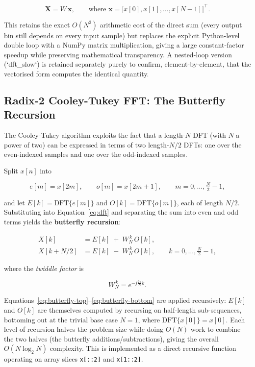 \documentclass[11pt]{article}
\begin{document}
\begin{equation}
\mathbf{X} = W\,\mathbf{x},
\qquad \text{where } \mathbf{x} = \big[x[0], x[1], \dots, x[N-1]\big]^{\!\top}.
\label{eq:dft-matrix-form}
\end{equation}

This retains the exact $O(N^2)$ arithmetic cost of the direct sum (every
output bin still depends on every input sample) but replaces the explicit
Python-level double loop with a NumPy matrix multiplication, giving a large
constant-factor speedup while preserving mathematical transparency. A
nested-loop version (`dft\_slow`) is retained separately purely to confirm,
element-by-element, that the vectorised form computes the identical
quantity.

\subsection{Radix-2 Cooley-Tukey FFT: The Butterfly Recursion}

The Cooley-Tukey algorithm exploits the fact that a length-$N$ DFT (with $N$
a power of two) can be expressed in terms of two length-$N/2$ DFTs: one over
the even-indexed samples and one over the odd-indexed samples.

Split $x[n]$ into

\begin{equation}
e[m] = x[2m], \qquad o[m] = x[2m+1], \qquad m = 0, \dots, \tfrac{N}{2}-1,
\end{equation}

and let $E[k] = \text{DFT}\{e[m]\}$ and $O[k] = \text{DFT}\{o[m]\}$, each of
length $N/2$. Substituting into Equation~\ref{eq:dft} and separating the sum
into even and odd terms yields the \textbf{butterfly recursion}:

\begin{align}
X[k]           &= E[k] \; + \; W_N^{\,k}\, O[k], \label{eq:butterfly-top}\\
X[k + N/2]     &= E[k] \; - \; W_N^{\,k}\, O[k], \qquad k = 0, \dots, \tfrac{N}{2}-1, \label{eq:butterfly-bottom}
\end{align}

where the \emph{twiddle factor} is

\begin{equation}
W_N^{\,k} = e^{-j \frac{2\pi}{N} k}.
\label{eq:twiddle-scalar}
\end{equation}

Equations~\ref{eq:butterfly-top}--\ref{eq:butterfly-bottom} are applied
recursively: $E[k]$ and $O[k]$ are themselves computed by recursing on
half-length sub-sequences, bottoming out at the trivial base case $N=1$,
where $\text{DFT}\{x[0]\} = x[0]$. Each level of recursion halves the
problem size while doing $O(N)$ work to combine the two halves (the
butterfly additions/subtractions), giving the overall
$O(N \log_2 N)$ complexity. This is implemented as a direct recursive
function operating on array slices \texttt{x[::2]} and \texttt{x[1::2]}.
\end{document}
